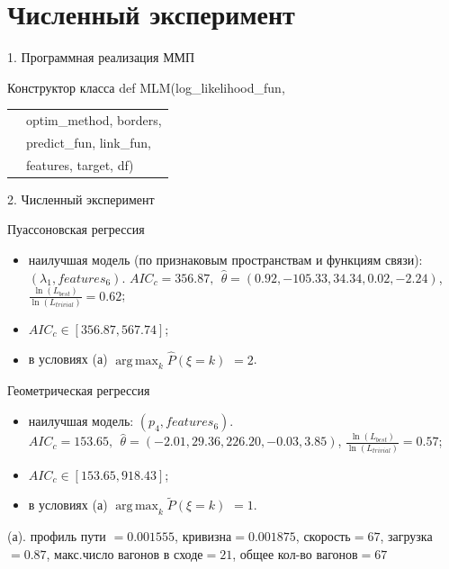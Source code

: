\documentclass[aspectratio=169]{beamer}
\DeclareMathOperator*{\argmax}{arg\,max}
\begin{document}
    
    \section{Численный эксперимент}
    \begin{frame}{1. Программная реализация ММП}
        \begin{block}{Конструктор класса}
            \textcolor{myGreen}{def} \textcolor{myBlue}{MLM}(log\_likelihood\_fun,\\
            \begin{tabular}{p{1cm}l}
                & optim\_method, borders,\\
                & predict\_fun, link\_fun,\\
                & features, target, df)
            \end{tabular}
        \end{block}
    \end{frame}
    
    
    \begin{frame}{2. Численный эксперимент}
        \scriptsize
        \begin{block}{Пуассоновская регрессия}
            \begin{itemize}
                \item наилучшая модель (по признаковым пространствам и функциям связи): $(\lambda_1, features_6)$. $AIC_c = 356.87,~~\hat\theta=(0.92, -105.33, 34.34, 0.02, -2.24)$, $\frac{\ln(L_{best})}{\ln(L_{trivial})} = 0.62$;
                \item $AIC_c \in [356.87, 567.74]$;
                \item в условиях (а) $\argmax_k \hat{P}(\xi = k)$ $ = 2$.
            \end{itemize}
        \end{block}
    
        \begin{block}{Геометрическая регрессия}
            \begin{itemize}
                \item наилучшая модель: $(p_4, features_6)$. $AIC_c = 153.65,~~\hat\theta=(-2.01, 29.36, 226.20, -0.03, 3.85)$, $\frac{\ln(L_{best})}{\ln(L_{trivial})} = 0.57$;
                \item $AIC_c \in [153.65, 918.43]$;
                \item в условиях (а) $\argmax_k \widetilde{P}(\xi = k)$ $ = 1$.
            \end{itemize}
        \end{block}
    
         (а). профиль пути $ = 0.001555$, кривизна$=0.001875$, скорость$=67$, загрузка$=0.87$, макс.число вагонов в сходе$=21$, общее кол-во вагонов$=67$
        
        \normalsize
    \end{frame}
\end{document}
